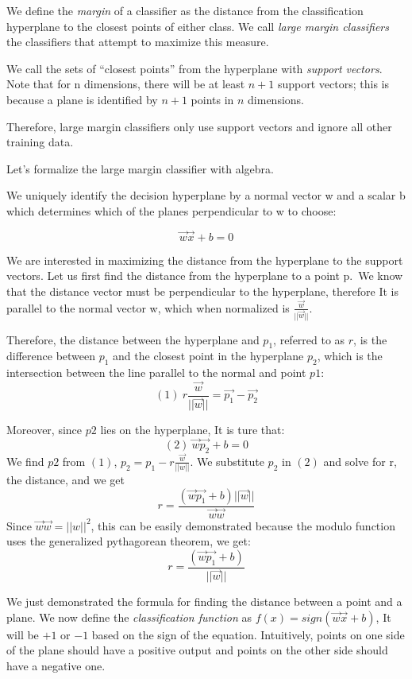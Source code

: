 \documentclass{article}
\begin{document}
We define the \emph{margin} of a classifier as the distance from the
classification hyperplane to the closest points of either class. We call
\emph{large margin classifiers} the classifiers that attempt to maximize
this measure.

We call the sets of ``closest points'' from the hyperplane with
\emph{support vectors}. Note that for n dimensions, there will be at
least \(n+1\) support vectors; this is because a plane is identified by
\(n+1\) points in \(n\) dimensions.

Therefore, large margin classifiers only use support vectors and ignore
all other training data.

Let's formalize the large margin classifier with algebra.

We uniquely identify the decision hyperplane by a normal vector w and a
scalar b which determines which of the planes perpendicular to w to
choose:

\[\vec{w}\vec{x} + b = 0\]

We are interested in maximizing the distance from the hyperplane to the
support vectors. Let us first find the distance from the hyperplane to a
point p.~We know that the distance vector must be perpendicular to the
hyperplane, therefore It is parallel to the normal vector w, which when
normalized is \(\frac{\vec{w}}{||\vec{w}||}\).

Therefore, the distance between the hyperplane and \(p_1\), referred to
as \(r\), is the difference between \(p_1\) and the closest point in the
hyperplane \(p_2\), which is the intersection between the line parallel
to the normal and point \(p1\):
\[(1)\ r\frac{\vec{w}}{||\vec{w}||} = \vec{p_1} - \vec{p_2}\]

Moreover, since \(p2\) lies on the hyperplane, It is ture that:
\[(2)\ \vec{w}\vec{p_2} + b = 0\] We find \(p2\) from \((1)\),
\(p_2 = p_1 - r\frac{\vec{w}}{||w||}\). We substitute \(p_2\) in \((2)\)
and solve for r, the distance, and we get
\[r = \frac{(\vec{w}\vec{p_1} + b) ||\vec{w}||}{\vec{w}\vec{w}}\] Since
\(\vec{w}\vec{w}=||w||^2\), this can be easily demonstrated because the
modulo function uses the generalized pythagorean theorem, we get:
\[r = \frac{(\vec{w}\vec{p_1} + b)}{||\vec{w}||}\]

We just demonstrated the formula for finding the distance between a
point and a plane. We now define the \emph{classification function} as
\(f(x)= sign(\vec{w}\vec{x} + b)\), It will be \(+1\) or \(-1\) based on
the sign of the equation. Intuitively, points on one side of the plane
should have a positive output and points on the other side should have a
negative one.
\end{document}
